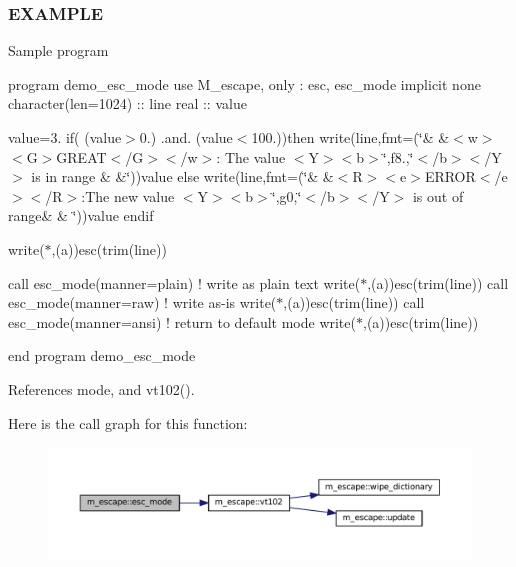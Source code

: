 \subsubsection*{E\+X\+A\+M\+P\+LE}

Sample program

program demo\+\_\+esc\+\_\+mode use M\+\_\+escape, only \+: esc, esc\+\_\+mode implicit none character(len=1024) \+:\+: line real \+:\+: value

value=3. if( (value$>$0.) .and. (value$<$100.))then write(line,fmt=\textquotesingle{}(\char`\"{}\&
       \&$<$w$>$$<$\+G$>$\+G\+R\+E\+A\+T$<$/\+G$>$$<$/w$>$\+: The value $<$\+Y$>$$<$b$>$\char`\"{},f8.,\char`\"{}$<$/b$>$$<$/\+Y$>$ is in range \&
       \&\char`\"{})\textquotesingle{})value else write(line,fmt=\textquotesingle{}(\char`\"{}\&
       \&$<$\+R$>$$<$e$>$\+E\+R\+R\+O\+R$<$/e$>$$<$/\+R$>$\+:\+The new value $<$\+Y$>$$<$b$>$\char`\"{},g0,\char`\"{}$<$/b$>$$<$/\+Y$>$ is out of range\&
       \& \char`\"{})\textquotesingle{})value endif

write($\ast$,\textquotesingle{}(a)\textquotesingle{})esc(trim(line))

call esc\+\_\+mode(manner=\textquotesingle{}plain\textquotesingle{}) ! write as plain text write($\ast$,\textquotesingle{}(a)\textquotesingle{})esc(trim(line)) call esc\+\_\+mode(manner=\textquotesingle{}raw\textquotesingle{}) ! write as-\/is write($\ast$,\textquotesingle{}(a)\textquotesingle{})esc(trim(line)) call esc\+\_\+mode(manner=\textquotesingle{}ansi\textquotesingle{}) ! return to default mode write($\ast$,\textquotesingle{}(a)\textquotesingle{})esc(trim(line))

end program demo\+\_\+esc\+\_\+mode 

References mode, and vt102().

Here is the call graph for this function\+:\nopagebreak
\begin{figure}[H]
\begin{center}
\leavevmode
\includegraphics[width=350pt]{namespacem__escape_a4210456d81d9a1bf328093a9635e640b_cgraph}
\end{center}
\end{figure}
\mbox{\label{namespacem__escape_af555c90c278ff964d8bce93ee0368a42}} 
